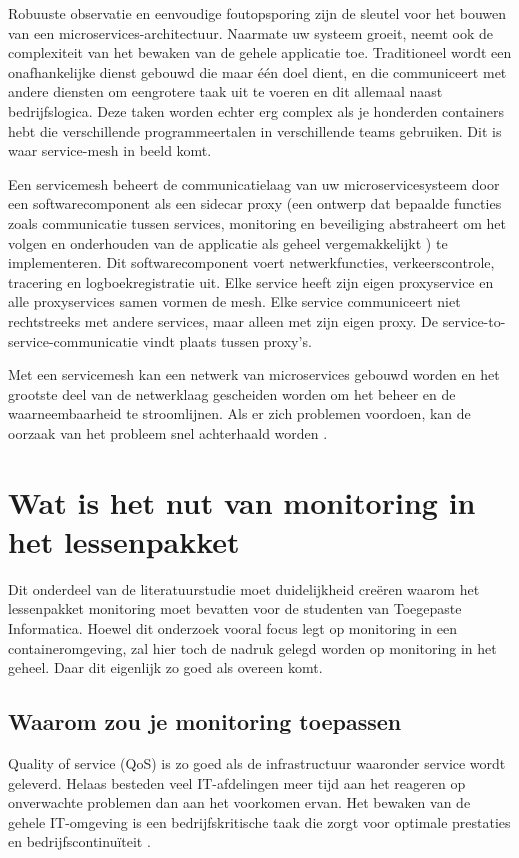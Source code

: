 Robuuste observatie en eenvoudige foutopsporing zijn de sleutel voor het bouwen van een microservices-architectuur. Naarmate uw systeem groeit, neemt ook de complexiteit van het bewaken van de gehele applicatie toe. Traditioneel wordt een onafhankelijke dienst gebouwd die maar één doel dient, en die communiceert met andere diensten om een ​​grotere taak uit te voeren en dit allemaal naast bedrijfslogica. Deze taken worden echter erg complex als je honderden containers hebt die verschillende programmeertalen in verschillende teams gebruiken. Dit is waar service-mesh in beeld komt. 

Een servicemesh beheert de communicatielaag van uw microservicesysteem door een softwarecomponent als een sidecar proxy (een ontwerp dat bepaalde functies zoals communicatie tussen services, monitoring en beveiliging abstraheert om het volgen en onderhouden van de applicatie als geheel vergemakkelijkt \autocite{Gilles2019}) te implementeren. Dit softwarecomponent voert netwerkfuncties, verkeerscontrole, tracering en logboekregistratie uit. Elke service heeft zijn eigen proxyservice en alle proxyservices samen vormen de mesh. Elke service communiceert niet rechtstreeks met andere services, maar alleen met zijn eigen proxy. De service-to-service-communicatie vindt plaats tussen proxy's. 

Met een servicemesh kan een netwerk van microservices gebouwd worden en het grootste deel van de netwerklaag gescheiden worden om het beheer en de waarneembaarheid te stroomlijnen. Als er zich problemen voordoen, kan de oorzaak van het probleem snel achterhaald worden \autocite{AWS2021}.

\section{Wat is het nut van monitoring in het lessenpakket}

Dit onderdeel van de literatuurstudie moet duidelijkheid creëren waarom het lessenpakket monitoring moet bevatten  voor de studenten van Toegepaste Informatica. Hoewel dit onderzoek vooral focus legt op monitoring in een containeromgeving, zal hier toch de nadruk gelegd worden op monitoring in het geheel. Daar dit eigenlijk zo goed als overeen komt.

\subsection{Waarom zou je monitoring toepassen}

Quality of service (QoS) is zo goed als de infrastructuur waaronder service wordt geleverd. Helaas besteden veel IT-afdelingen meer tijd aan het reageren op onverwachte problemen dan aan het voorkomen ervan. Het bewaken van de gehele IT-omgeving is een bedrijfskritische taak die zorgt voor optimale prestaties en bedrijfscontinuïteit \autocite{Matrix2016}.


